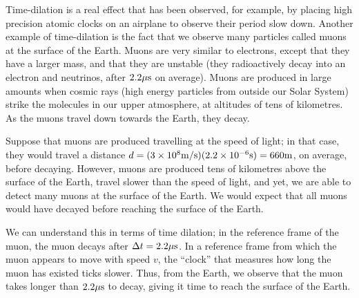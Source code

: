 Time-dilation is a real effect that has been observed, for example, by placing high precision atomic clocks on an airplane to observe their period slow down. Another example of time-dilation is the fact that we observe many particles called muons at the surface of the Earth. Muons are very similar to electrons, except that they have a larger mass, and that they are unstable (they radioactively decay into an electron and neutrinos, after $2.2 {\rm \mu s}$ on average). Muons are produced in large amounts when cosmic rays (high energy particles from outside our Solar System) strike the molecules in our upper atmosphere, at altitudes of tens of kilometres. As the muons travel down towards the Earth, they decay.

Suppose that muons are produced travelling at the speed of light; in that case, they would travel a distance $d=(3\times 10^{8} {\rm m/s})(2.2\times 10^{ -6} {\rm s})=660 {\rm m}$, on average, before decaying. However, muons are produced tens of kilometres above the surface of the Earth, travel slower than the speed of light, and yet, we are able to detect many muons at the surface of the Earth. We would expect that all muons would have decayed before reaching the surface of the Earth.

We can understand this in terms of time dilation; in the reference frame of the muon, the muon decays after $\Delta t=2.2 {\rm \mu s}$. In a reference frame from which the muon appears to move with speed $v$, the ``clock'' that measures how long the muon has existed ticks slower. Thus, from the Earth, we observe that the muon takes longer than $2.2 {\rm \mu s}$ to decay, giving it time to reach the surface of the Earth.

